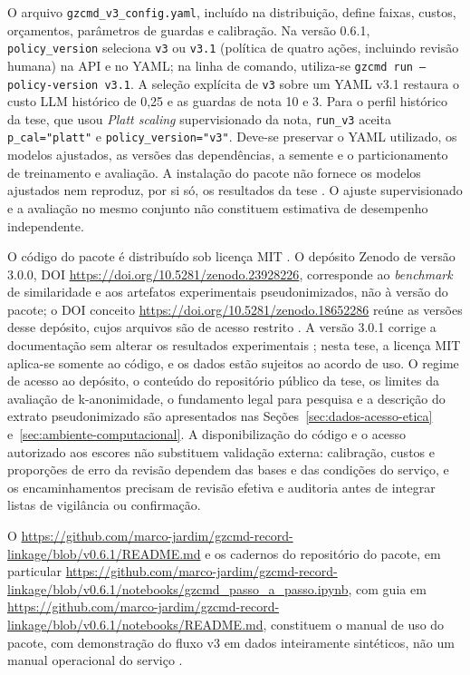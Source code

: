 O arquivo \texttt{gzcmd\_v3\_config.yaml}, incluído na distribuição, define faixas, custos, orçamentos, parâmetros de guardas e calibração. Na versão 0.6.1, \texttt{policy\_version} seleciona \texttt{v3} ou \texttt{v3.1} (política de quatro ações, incluindo revisão humana) na API e no YAML; na linha de comando, utiliza-se \texttt{gzcmd run --policy-version v3.1}. A seleção explícita de \texttt{v3} sobre um YAML v3.1 restaura o custo LLM histórico de 0,25 e as guardas de nota 10 e 3. Para o perfil histórico da tese, que usou \textit{Platt scaling} supervisionado da nota, \texttt{run\_v3} aceita \texttt{p\_cal="platt"} e \texttt{policy\_version="v3"}. Deve-se preservar o YAML utilizado, os modelos ajustados, as versões das dependências, a semente e o particionamento de treinamento e avaliação. A instalação do pacote não fornece os modelos ajustados nem reproduz, por si só, os resultados da tese \cite{Jardim2026phdrepo}. O ajuste supervisionado e a avaliação no mesmo conjunto não constituem estimativa de desempenho independente.

O código do pacote é distribuído sob licença MIT \cite{Jardim2026gzcmd}. O depósito Zenodo de versão 3.0.0, DOI \url{https://doi.org/10.5281/zenodo.23928226}, corresponde ao \textit{benchmark} de similaridade e aos artefatos experimentais pseudonimizados, não à versão do pacote; o DOI conceito \url{https://doi.org/10.5281/zenodo.18652286} reúne as versões desse depósito, cujos arquivos são de acesso restrito \cite{Jardim2026zenodoGzcmd,Jardim2026zenodo}. A versão 3.0.1 corrige a documentação sem alterar os resultados experimentais \cite{Jardim2026zenodoGzcmd301}; nesta tese, a licença MIT aplica-se somente ao código, e os dados estão sujeitos ao acordo de uso. O regime de acesso ao depósito, o conteúdo do repositório público da tese, os limites da avaliação de k-anonimidade, o fundamento legal para pesquisa e a descrição do extrato pseudonimizado são apresentados nas Seções~\ref{sec:dados-acesso-etica} e~\ref{sec:ambiente-computacional}. A disponibilização do código e o acesso autorizado aos escores não substituem validação externa: calibração, custos e proporções de erro da revisão dependem das bases e das condições do serviço, e os encaminhamentos precisam de revisão efetiva e auditoria antes de integrar listas de vigilância ou confirmação.

O \url{https://github.com/marco-jardim/gzcmd-record-linkage/blob/v0.6.1/README.md} e os cadernos do repositório do pacote, em particular \url{https://github.com/marco-jardim/gzcmd-record-linkage/blob/v0.6.1/notebooks/gzcmd_passo_a_passo.ipynb}, com guia em \url{https://github.com/marco-jardim/gzcmd-record-linkage/blob/v0.6.1/notebooks/README.md}, constituem o manual de uso do pacote, com demonstração do fluxo v3 em dados inteiramente sintéticos, não um manual operacional do serviço \cite{Jardim2026gzcmd}.


